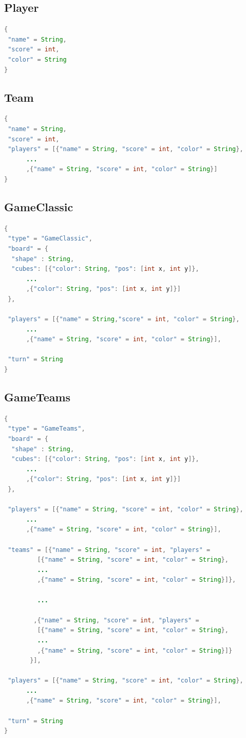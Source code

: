 \documentclass[12pt,a4paper,openright]{book}
\theoremstyle{break}
\begin{document}
\subsection*{Player}

\begin{lstlisting}[frame=single, language=Java]
{
 "name" = String,
 "score" = int,
 "color" = String
}
\end{lstlisting}

\subsection*{Team}

\begin{lstlisting}[frame=single, language=Java]
{
 "name" = String,
 "score" = int,
 "players" = [{"name" = String, "score" = int, "color" = String},
 	  ...
 	  ,{"name" = String, "score" = int, "color" = String}]
}
\end{lstlisting}

\newpage

\subsection*{GameClassic}
\begin{lstlisting}[frame=single, language=Java]
{
 "type" = "GameClassic",
 "board" = {
  "shape" : String,
  "cubes": [{"color": String, "pos": [int x, int y]},
  	  ...
  	  ,{"color": String, "pos": [int x, int y]}]
 },
 
 "players" = [{"name" = String,"score" = int, "color" = String},
 	  ...
 	  ,{"name" = String, "score" = int, "color" = String}],
 
 "turn" = String	
}
\end{lstlisting}

\subsection*{GameTeams}
\begin{lstlisting}[frame=single, language=Java]
{
 "type" = "GameTeams",
 "board" = {
  "shape" : String,
  "cubes": [{"color": String, "pos": [int x, int y]},
  	  ...
  	  ,{"color": String, "pos": [int x, int y]}]
 },
 
 "players" = [{"name" = String, "score" = int, "color" = String},
 	  ...
 	  ,{"name" = String, "score" = int, "color" = String}],
 
 "teams" = [{"name" = String, "score" = int, "players" = 
 	     [{"name" = String, "score" = int, "color" = String},
 	     ...
 	     ,{"name" = String, "score" = int, "color" = String}]},
 	     
 	     ...
 	     
 	    ,{"name" = String, "score" = int, "players" = 
 	     [{"name" = String, "score" = int, "color" = String},
 	     ...
 	     ,{"name" = String, "score" = int, "color" = String}]}
	   }],
	   
 "players" = [{"name" = String, "score" = int, "color" = String},
 	  ...
 	  ,{"name" = String, "score" = int, "color" = String}],
 
 "turn" = String	
}
\end{lstlisting}
\end{document}
